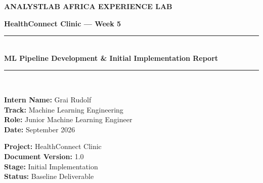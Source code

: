 \documentclass[11pt,a4paper]{article}
\begin{document}
\begin{titlepage}
\centering
\vspace*{1cm}
{\huge\bfseries\color{primary} ANALYSTLAB AFRICA EXPERIENCE LAB\par}
\vspace{0.5cm}
{\Large\bfseries\color{secondary} HealthConnect Clinic — Week 5\par}
\vspace{1.5cm}

\rule{\linewidth}{1.5pt}\\[0.4cm]
{\huge \bfseries ML Pipeline Development \& Initial Implementation Report}\\[0.4cm]
\rule{\linewidth}{1.5pt}\\[1.5cm]

\begin{minipage}{0.48\textwidth}
\begin{flushleft} \large
\textbf{Intern Name:} Grai Rudolf\\
\textbf{Track:} Machine Learning Engineering\\
\textbf{Role:} Junior Machine Learning Engineer\\
\textbf{Date:} September 2026
\end{flushleft}
\end{minipage}
\begin{minipage}{0.48\textwidth}
\begin{flushright} \large
\textbf{Project:} HealthConnect Clinic\\
\textbf{Document Version:} 1.0\\
\textbf{Stage:} Initial Implementation\\
\textbf{Status:} Baseline Deliverable
\end{flushright}
\end{minipage}

\vfill
\begin{abstract}
\noindent This document presents the Week 5 practical implementation of the HealthConnect
Experience Lab from the Machine Learning Engineering track. Building directly on the Week 4 problem
definition and production system design, we deliver a modular, reusable ML pipeline comprising
data cleaning with explicit leakage control, a reusable preprocessing transformer, behavioural
feature engineering, and an initial model workflow that trains and benchmarks five baseline
classifiers. The primary baseline (Logistic Regression) achieves a held-out recall of $0.65$ and
ROC-AUC of $0.66$, confirming that pre-appointment signals carry meaningful predictive value. We
also document component testing evidence, implementation issues, dependencies, and a clear focus
for Week 6.
\end{abstract}

\vfill
\end{titlepage}
\end{document}
